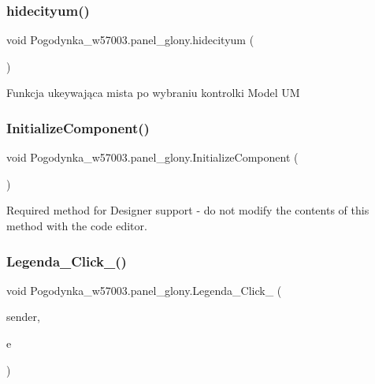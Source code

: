\subsubsection{\texorpdfstring{hidecityum()}{hidecityum()}}
{\footnotesize\ttfamily void Pogodynka\+\_\+w57003.\+panel\+\_\+glony.\+hidecityum (\begin{DoxyParamCaption}{ }\end{DoxyParamCaption})\hspace{0.3cm}{\ttfamily [private]}}



Funkcja ukeywająca mista po wybraniu kontrolki Model UM 

\mbox{\label{class_pogodynka__w57003_1_1panel__glony_a611ee70952200993f8066c71042452de}} 
\subsubsection{\texorpdfstring{Initialize\+Component()}{InitializeComponent()}}
{\footnotesize\ttfamily void Pogodynka\+\_\+w57003.\+panel\+\_\+glony.\+Initialize\+Component (\begin{DoxyParamCaption}{ }\end{DoxyParamCaption})\hspace{0.3cm}{\ttfamily [private]}}



Required method for Designer support -\/ do not modify the contents of this method with the code editor. 

\mbox{\label{class_pogodynka__w57003_1_1panel__glony_ae9fe7cb3a32f5d4c437ab29212d6ea42}} 
\subsubsection{\texorpdfstring{Legenda\+\_\+\+Click\+\_()}{Legenda\_Click\_1()}}
{\footnotesize\ttfamily void Pogodynka\+\_\+w57003.\+panel\+\_\+glony.\+Legenda\+\_\+\+Click\+\_ (\begin{DoxyParamCaption}\item[{object}]{sender,  }\item[{Event\+Args}]{e }\end{DoxyParamCaption})\hspace{0.3cm}{\ttfamily [private]}}



